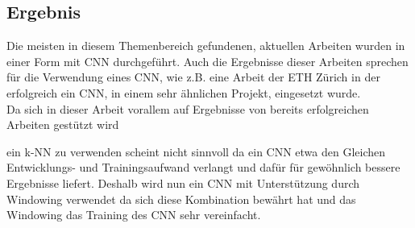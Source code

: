 \subsection{Ergebnis}

Die meisten in diesem Themenbereich gefundenen, aktuellen Arbeiten wurden in einer Form mit \gls{CNN} durchgeführt. Auch die Ergebnisse dieser Arbeiten sprechen für die Verwendung eines \gls{CNN}, wie z.B. eine Arbeit der ETH Zürich \parencite{gomez2018thermal} in der erfolgreich ein \gls{CNN}, in einem sehr ähnlichen Projekt, eingesetzt wurde. \\
Da sich in dieser Arbeit vorallem auf Ergebnisse von bereits erfolgreichen Arbeiten gestützt wird


ein \gls{k-NN} zu verwenden scheint nicht sinnvoll da ein \gls{CNN} etwa den Gleichen Entwicklungs- und Trainingsaufwand verlangt und dafür für gewöhnlich bessere Ergebnisse liefert.
Deshalb wird nun ein CNN mit Unterstützung durch Windowing verwendet da sich diese Kombination bewährt hat \parencite{gomez2018thermal} und das Windowing das Training des CNN sehr vereinfacht.



